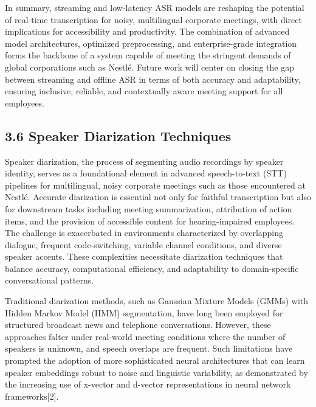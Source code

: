 \documentclass[12pt,a4paper]{article}
\begin{document}
In summary, streaming and low-latency ASR models are reshaping the potential of real-time transcription for noisy, multilingual corporate meetings, with direct implications for accessibility and productivity. The combination of advanced model architectures, optimized preprocessing, and enterprise-grade integration forms the backbone of a system capable of meeting the stringent demands of global corporations such as Nestlé. Future work will center on closing the gap between streaming and offline ASR in terms of both accuracy and adaptability, ensuring inclusive, reliable, and contextually aware meeting support for all employees.


\subsection{3.6 Speaker Diarization Techniques}


Speaker diarization, the process of segmenting audio recordings by speaker identity, serves as a foundational element in advanced speech-to-text (STT) pipelines for multilingual, noisy corporate meetings such as those encountered at Nestlé. Accurate diarization is essential not only for faithful transcription but also for downstream tasks including meeting summarization, attribution of action items, and the provision of accessible content for hearing-impaired employees. The challenge is exacerbated in environments characterized by overlapping dialogue, frequent code-switching, variable channel conditions, and diverse speaker accents. These complexities necessitate diarization techniques that balance accuracy, computational efficiency, and adaptability to domain-specific conversational patterns.


Traditional diarization methods, such as Gaussian Mixture Models (GMMs) with Hidden Markov Model (HMM) segmentation, have long been employed for structured broadcast news and telephone conversations. However, these approaches falter under real-world meeting conditions where the number of speakers is unknown, and speech overlaps are frequent. Such limitations have prompted the adoption of more sophisticated neural architectures that can learn speaker embeddings robust to noise and linguistic variability, as demonstrated by the increasing use of x-vector and d-vector representations in neural network frameworks[2].
\end{document}
